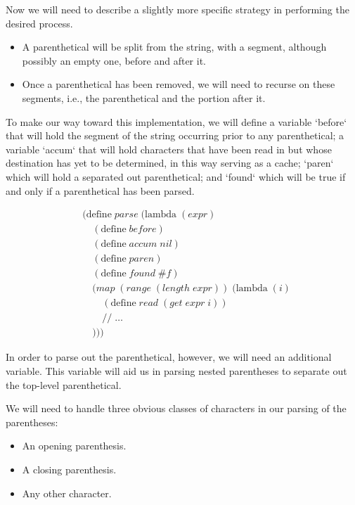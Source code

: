 Now we will need to describe a slightly more specific strategy in performing the desired 
process.

\begin{itemize}
  \item A parenthetical will be split from the string, with a segment, although possibly an empty one, before and after it.
  \item Once a parenthetical has been removed, we will need to recurse on these segments, i.e., the parenthetical and the portion after it.
\end{itemize}

To make our way toward this implementation, we will define a variable `before` that will 
hold the segment of the string occurring prior to any parenthetical; a variable `accum` 
that will hold characters that have been read in but whose destination has yet to be 
determined, in this way serving as a cache; `paren` which will hold a separated out 
parenthetical; and `found` which will be true if and only if a parenthetical has been 
parsed.

\begin{align*}
& (\text{define} \; parse \; (\text{lambda} \; (expr) \; 
\\& \quad (\text{define} \; before)
\\& \quad (\text{define} \; accum \; nil)
\\& \quad (\text{define} \; paren)
\\& \quad (\text{define} \; found \; \#f)
\\& \quad (map \; (range \; (length \; expr)) \; (\text{lambda} \; (i)
\\& \qquad (\text{define} \; read \; (get \; expr \; i))
\\& \qquad // \; \dots
\\& \quad )))
\end{align*}

In order to parse out the parenthetical, however, we will need an additional variable. 
This variable will aid us in parsing nested parentheses to separate out the top-level parenthetical.

We will need to handle three obvious classes of characters in our parsing of the parentheses:

\begin{itemize}
  \item An opening parenthesis.
  \item A closing parenthesis.
  \item Any other character.
\end{itemize}

